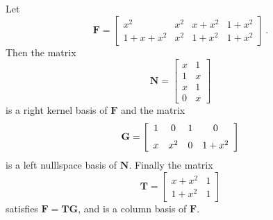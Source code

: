 \begin{exmp}
Let 
\[
\mathbf{F}=\left[\begin{array}{cccc}
x^{2} & x^{2} & x+x^{2} & 1+x^{2}\\
1+x+x^{2} & x^{2} & 1+x^{2} & 1+x^{2}
\end{array}\right]~.
\]
Then the matrix 
\[
\mathbf{N}=\left[\begin{array}{cc}
x & 1\\
1 & x\\
x & 1\\
0 & x
\end{array}\right]
\]
is a right kernel basis of $\mathbf{F}$ and the matrix 
\[
\mathbf{G}=\left[\begin{array}{cccc}
1 & 0 & 1 & 0\\
\noalign{\medskip}x & {x}^{2} & 0 & 1+{x}^{2}
\end{array}\right]
\]
is a left nulllspace basis of $\mathbf{N}$. Finally the matrix 
\[
\mathbf{T}=\left[\begin{array}{cc}
x+x^{2} & 1\\
1+x^{2} & 1
\end{array}\right]
\]
satisfies $\mathbf{F}=\mathbf{T}\mathbf{G}$, and is a column basis
of $\mathbf{F}$. \end{exmp}

